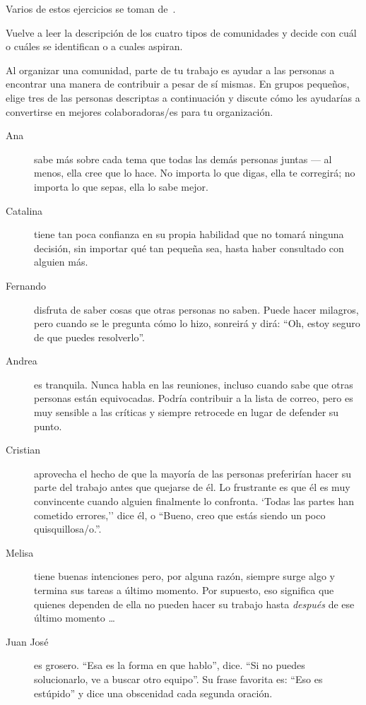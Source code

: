 
Varios de estos ejercicios se toman de~\cite{Brow2007}.


Vuelve a leer la descripción de los cuatro tipos de comunidades
y decide con cuál o cuáles se identifican o a cuales aspiran.


Al organizar una comunidad,
parte de tu trabajo es ayudar a las personas a encontrar una manera de contribuir a pesar de sí mismas.
En grupos pequeños,
elige tres de las personas descriptas a continuación
y discute cómo les ayudarías a convertirse en mejores colaboradoras/es para tu organización.

\begin{description}

\item[Ana]
  sabe más sobre cada tema que todas las demás personas juntas --- al menos,
  ella cree que lo hace.
  No importa lo que digas,
  ella te corregirá;
  no importa lo que sepas, ella lo sabe mejor.
    
\item[Catalina]
  tiene tan poca confianza en su propia habilidad
  que no tomará ninguna decisión,
  sin importar qué tan pequeña sea,
  hasta haber consultado con alguien más.

\item[Fernando]
  disfruta de saber cosas que otras personas no saben.
  Puede hacer milagros,
  pero cuando se le pregunta cómo lo hizo,
  sonreirá y dirá:
  ``Oh, estoy seguro de que puedes resolverlo''.

\item[Andrea]
  es tranquila.
  Nunca habla en las reuniones,
  incluso cuando sabe que otras personas están equivocadas.
  Podría contribuir a la lista de correo,
  pero es muy sensible a las críticas
  y siempre retrocede en lugar de defender su punto.

\item[Cristian]
  aprovecha el hecho de que la mayoría de las personas preferirían hacer su parte del trabajo antes 
  que quejarse de él.
  Lo frustrante es que él es muy convincente cuando alguien finalmente lo confronta.
  `Todas las partes han cometido errores,''
  dice él,
  o ``Bueno, creo que estás siendo un poco quisquillosa/o.''.

\item[Melisa]
  tiene buenas intenciones
  pero, por alguna razón, siempre surge algo
  y termina sus tareas a último momento.
  Por supuesto,
  eso significa que quienes dependen de ella no pueden hacer su trabajo
  hasta \emph{después} de ese último momento {\ldots}
 
\item[Juan José]
 es grosero.
  ``Esa es la forma en que hablo'', dice.
  ``Si no puedes solucionarlo, ve a buscar otro equipo''.
  Su frase favorita es: ``Eso es estúpido''
  y dice una obscenidad cada segunda oración.

\end{description}


